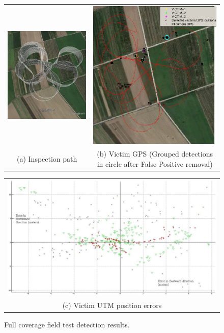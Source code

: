 \documentclass[runningheads]{llncs}
\begin{document}
\begin{figure}
  \centering
  \begin{tabular}{cc}
    \hspace{-1cm}
    \includegraphics[width=7cm]{img/victim_gps/SIP.png} &
    \includegraphics[width=7cm]{img/victim_gps/SIP_detections_map.eps} \\
    \small (a) Inspection path & 
    \small (b) Victim GPS \tiny (Grouped detections in circle after False Positive removal)
  \end{tabular}

  \vspace{\floatsep}
  
  \begin{tabular}{c}
    \includegraphics[width=11cm]{img/victim_gps/victim_utm_errors.jpg} \\
    \small (c) Victim UTM position errors
  \end{tabular}

  \caption{Full coverage field test detection results.}\label{fig:victim_gps}
\end{figure}
\end{document}
